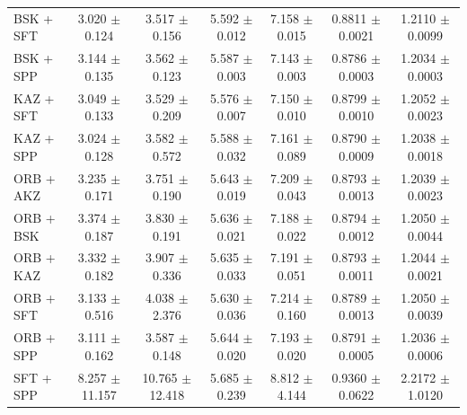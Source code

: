 \begin{table}[hbp]
\begin{tabular}{lcccccc}
BSK + SFT & 3.020 $\pm$ 0.124 & 3.517 $\pm$ 0.156 & 5.592 $\pm$ 0.012 & 7.158 $\pm$ 0.015 & 0.8811 $\pm$ 0.0021 & 1.2110 $\pm$ 0.0099 \\
BSK + SPP & 3.144 $\pm$ 0.135 & 3.562 $\pm$ 0.123 & 5.587 $\pm$ 0.003 & 7.143 $\pm$ 0.003 & 0.8786 $\pm$ 0.0003 & 1.2034 $\pm$ 0.0003 \\
KAZ + SFT & 3.049 $\pm$ 0.133 & 3.529 $\pm$ 0.209 & 5.576 $\pm$ 0.007 & 7.150 $\pm$ 0.010 & 0.8799 $\pm$ 0.0010 & 1.2052 $\pm$ 0.0023 \\
KAZ + SPP & 3.024 $\pm$ 0.128 & 3.582 $\pm$ 0.572 & 5.588 $\pm$ 0.032 & 7.161 $\pm$ 0.089 & 0.8790 $\pm$ 0.0009 & 1.2038 $\pm$ 0.0018 \\
ORB + AKZ & 3.235 $\pm$ 0.171 & 3.751 $\pm$ 0.190 & 5.643 $\pm$ 0.019 & 7.209 $\pm$ 0.043 & 0.8793 $\pm$ 0.0013 & 1.2039 $\pm$ 0.0023 \\
ORB + BSK & 3.374 $\pm$ 0.187 & 3.830 $\pm$ 0.191 & 5.636 $\pm$ 0.021 & 7.188 $\pm$ 0.022 & 0.8794 $\pm$ 0.0012 & 1.2050 $\pm$ 0.0044 \\
ORB + KAZ & 3.332 $\pm$ 0.182 & 3.907 $\pm$ 0.336 & 5.635 $\pm$ 0.033 & 7.191 $\pm$ 0.051 & 0.8793 $\pm$ 0.0011 & 1.2044 $\pm$ 0.0021 \\
ORB + SFT & 3.133 $\pm$ 0.516 & 4.038 $\pm$ 2.376 & 5.630 $\pm$ 0.036 & 7.214 $\pm$ 0.160 & 0.8789 $\pm$ 0.0013 & 1.2050 $\pm$ 0.0039 \\
ORB + SPP & 3.111 $\pm$ 0.162 & 3.587 $\pm$ 0.148 & 5.644 $\pm$ 0.020 & 7.193 $\pm$ 0.020 & 0.8791 $\pm$ 0.0005 & 1.2036 $\pm$ 0.0006 \\
SFT + SPP & 8.257 $\pm$ 11.157 & 10.765 $\pm$ 12.418 & 5.685 $\pm$ 0.239 & 8.812 $\pm$ 4.144 & 0.9360 $\pm$ 0.0622 & 2.2172 $\pm$ 1.0120 \\
\bottomrule
\end{tabular}
\end{table}